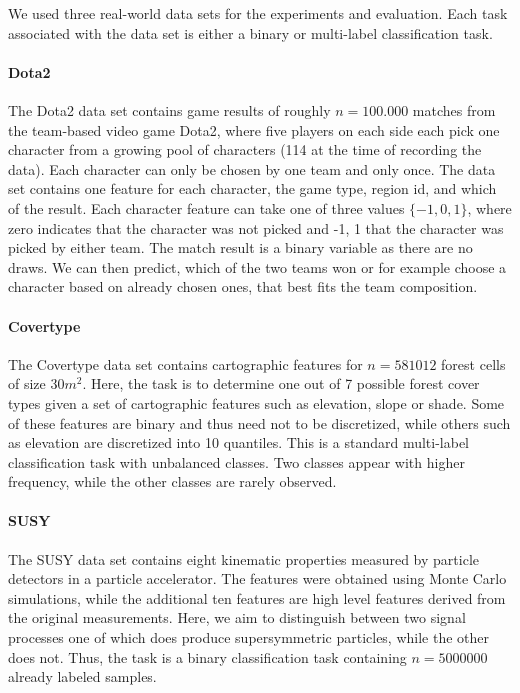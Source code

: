 We used three real-world data sets for the experiments and evaluation. 
Each task associated with the data set is either a binary or multi-label classification task.

\paragraph*{Dota2}
The Dota2 data set contains game results of roughly $n=100.000$ matches from the team-based video game Dota2, where five players on each side each pick one character from a growing pool of characters (114 at the time of recording the data).
Each character can only be chosen by one team and only once.
The data set contains one feature for each character, the game type, region id, and which of the result.
Each character feature can take one of three values $\{-1,0,1\}$, where zero indicates that the character was not picked and -1, 1 that the character was picked by either team.
The match result is a binary variable as there are no draws.
We can then predict, which of the two teams won or for example choose a character based on already chosen ones, that best fits the team composition.

\paragraph*{Covertype}
The Covertype data set contains cartographic features for  $n=581012$ forest cells of size $30m^2$.
Here, the task is to determine one out of 7 possible forest cover types given a set of cartographic features such as elevation, slope or shade. 
Some of these features are binary and thus need not to be discretized, while others such as elevation are discretized into 10 quantiles.
This is a standard multi-label classification task with unbalanced classes.
Two classes appear with higher frequency, while the other classes are rarely observed.

\paragraph*{SUSY}
The SUSY data set contains eight kinematic properties measured by particle detectors in a particle accelerator. 
The features were obtained using Monte Carlo simulations, while the additional ten features are high level features derived from the original measurements.
Here, we aim to distinguish between two signal processes one of which does produce supersymmetric particles, while the other does not. 
Thus, the task is a binary classification task containing $n=5000000$ already labeled samples.

